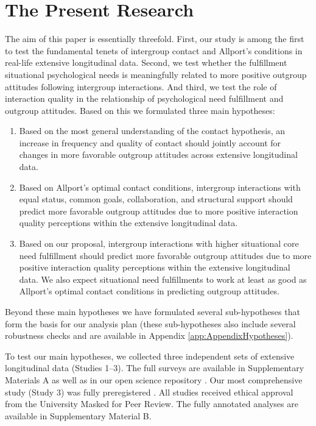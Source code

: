 \documentclass[man, 12pt, a4paper, mask]{apa7}
\theoremstyle{break}
\theoremstyle{plain}
\begin{document}
\section{The Present Research}
The aim of this paper is essentially threefold. First, our study is among the first to test the fundamental tenets of intergroup contact and Allport's conditions in real-life extensive longitudinal data. Second, we test whether the fulfillment situational psychological needs is meaningfully related to more positive outgroup attitudes following intergroup interactions. And third, we test the role of interaction quality in  the relationship of psychological need fulfillment and outgroup attitudes. Based on this we formulated three main hypotheses:
\begin{enumerate}[label=H\arabic*:]
    \item Based on the most general understanding of the contact hypothesis, an increase in frequency and quality of contact should jointly account for changes in more favorable outgroup attitudes across extensive longitudinal data.
    \item Based on Allport’s optimal contact conditions, intergroup interactions with equal status, common goals, collaboration, and structural support should predict more favorable outgroup attitudes due to more positive interaction quality perceptions within the extensive longitudinal data.
    \item Based on our proposal, intergroup interactions with higher situational core need fulfillment should predict more favorable outgroup attitudes due to more positive interaction quality perceptions within the extensive longitudinal data. We also expect situational need fulfillments to work at least as good as Allport's optimal contact conditions in predicting outgroup attitudes.
\end{enumerate}
Beyond these main hypotheses we have formulated several sub-hypotheses that form the basis for our analysis plan (these sub-hypotheses also include several robustness checks and are available in Appendix \ref{app:AppendixHypotheses}). 

To test our main hypotheses, we collected three independent sets of extensive longitudinal data (Studies 1–3). The full surveys are available in Supplementary Materials A as well as in our open science repository \citep[including a complete codebook, see][]{KreienkampMasked2022a}. Our most comprehensive study (Study 3) was fully preregistered  \citep[available at][]{KreienkampMasked2021f}. All studies received ethical approval from the University Masked for Peer Review. The fully annotated analyses are available in Supplementary Material B. 
\end{document}
